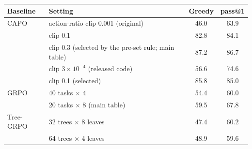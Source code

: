 \begin{tabular}{l l c c}
\toprule
Baseline & Setting & Greedy & pass@1 \\
\midrule
CAPO & action-ratio clip 0.001 (original) & 46.0 & 63.9 \\
 & clip 0.1 & 82.8 & 84.1 \\
 & clip 0.3 (selected by the pre-set rule; main table) & 87.2 & 86.7 \\
\steppo{} & clip $3\times10^{-4}$ (released code) & 56.6 & 74.6 \\
 & clip 0.1 (selected) & 85.8 & 85.0 \\
GRPO & 40 tasks $\times$ 4 & 54.4 & 60.0 \\
 & 20 tasks $\times$ 8 (main table) & 59.5 & 67.8 \\
Tree-GRPO & 32 trees $\times$ 8 leaves & 47.4 & 60.2 \\
 & 64 trees $\times$ 4 leaves & 48.9 & 59.6 \\
\bottomrule
\end{tabular}
